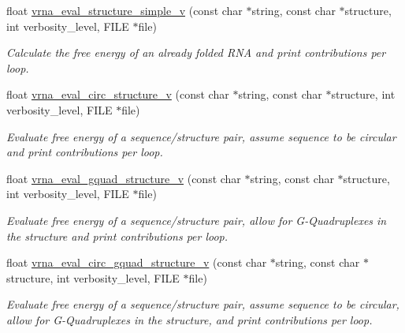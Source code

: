 \begin{DoxyCompactItemize}
float \hyperlink{group__eval_gacd6278343e77d13f1d53588e50d303bc}{vrna\+\_\+eval\+\_\+structure\+\_\+simple\+\_\+v} (const char $\ast$string, const char $\ast$structure, int verbosity\+\_\+level, F\+I\+LE $\ast$file)
\begin{DoxyCompactList}\small\item\em Calculate the free energy of an already folded R\+NA and print contributions per loop. \end{DoxyCompactList}\item 
float \hyperlink{group__eval_gac3fb44e0773a51be8efc5f4f595a94a7}{vrna\+\_\+eval\+\_\+circ\+\_\+structure\+\_\+v} (const char $\ast$string, const char $\ast$structure, int verbosity\+\_\+level, F\+I\+LE $\ast$file)
\begin{DoxyCompactList}\small\item\em Evaluate free energy of a sequence/structure pair, assume sequence to be circular and print contributions per loop. \end{DoxyCompactList}\item 
float \hyperlink{group__eval_gaeaa2bdbc1b5d78c667e735fbdff87fff}{vrna\+\_\+eval\+\_\+gquad\+\_\+structure\+\_\+v} (const char $\ast$string, const char $\ast$structure, int verbosity\+\_\+level, F\+I\+LE $\ast$file)
\begin{DoxyCompactList}\small\item\em Evaluate free energy of a sequence/structure pair, allow for G-\/\+Quadruplexes in the structure and print contributions per loop. \end{DoxyCompactList}\item 
float \hyperlink{group__eval_gab96a6c59923ff06c35f8c2fd2c239727}{vrna\+\_\+eval\+\_\+circ\+\_\+gquad\+\_\+structure\+\_\+v} (const char $\ast$string, const char $\ast$structure, int verbosity\+\_\+level, F\+I\+LE $\ast$file)
\begin{DoxyCompactList}\small\item\em Evaluate free energy of a sequence/structure pair, assume sequence to be circular, allow for G-\/\+Quadruplexes in the structure, and print contributions per loop. \end{DoxyCompactList}\end{DoxyCompactItemize}

